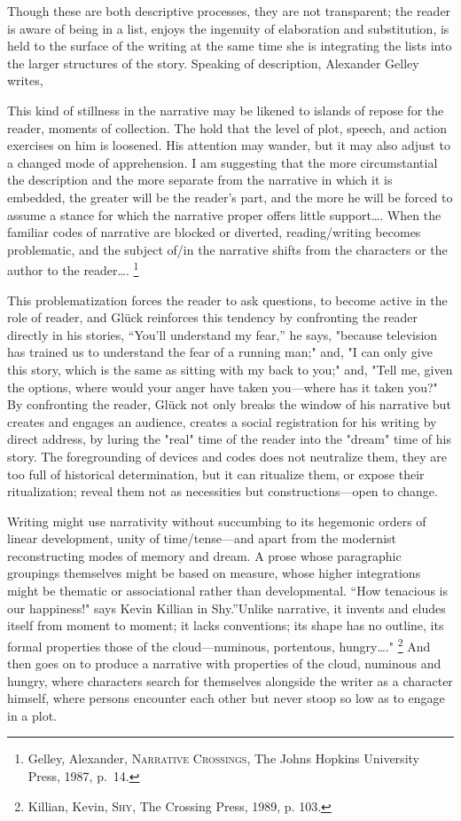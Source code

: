 \documentclass[
]{memoir}
\begin{document}
Though these are both descriptive processes, they are not transparent;
the reader is aware of being in a list, enjoys the ingenuity of
elaboration and substitution, is held to the surface of the writing at
the same time she is integrating the lists into the larger structures of
the story. Speaking of description, Alexander Gelley writes,

This kind of stillness in the narrative may be likened to islands of
repose for the reader, moments of collection. The hold that the level of
plot, speech, and action exercises on him is loosened. His attention may
wander, but it may also adjust to a changed mode of apprehension. I am
suggesting that the more circumstantial the description and the more
separate from the narrative in which it is embedded, the greater will be
the reader's part, and the more he will be forced to assume a stance for
which the narrative proper offers little support\ldots{}. When the
familiar codes of narrative are blocked or diverted, reading/writing
becomes problematic, and the subject of/in the narrative shifts from the
characters or the author to the reader\ldots{}. \footnote{Gelley,
  Alexander, \textsc{Narrative Crossings}, The Johns Hopkins University
  Press, 1987, p.~14.}

This problematization forces the reader to ask questions, to become
active in the role of reader, and Glück reinforces this tendency by
confronting the reader directly in his stories, ``You'll understand my
fear,'' he says, "because television has trained us to understand the
fear of a running man;" and, "I can only give this story, which is the
same as sitting with my back to you;" and, "Tell me, given the options,
where would your anger have taken you---where has it taken you?" By
confronting the reader, Glück not only breaks the window of his
narrative but creates and engages an audience, creates a social
registration for his writing by direct address, by luring the "real"
time of the reader into the "dream" time of his story. The foregrounding
of devices and codes does not neutralize them, they are too full of
historical determination, but it can ritualize them, or expose their
ritualization; reveal them not as necessities but constructions---open
to change.

Writing might use narrativity without succumbing to its hegemonic orders
of linear development, unity of time/tense---and apart from the
modernist reconstructing modes of memory and dream. A prose whose
paragraphic groupings themselves might be based on measure, whose higher
integrations might be thematic or associational rather than
developmental. ``How tenacious is our happiness!" says Kevin Killian in
Shy.''Unlike narrative, it invents and eludes itself from moment to
moment; it lacks conventions; its shape has no outline, its formal
properties those of the cloud---numinous, portentous, hungry\ldots{}."
\footnote{Killian, Kevin, \textsc{Shy}, The Crossing Press, 1989, p.
  103.} And then goes on to produce a narrative with properties of the
cloud, numinous and hungry, where characters search for themselves
alongside the writer as a character himself, where persons encounter
each other but never stoop so low as to engage in a plot.
\end{document}

